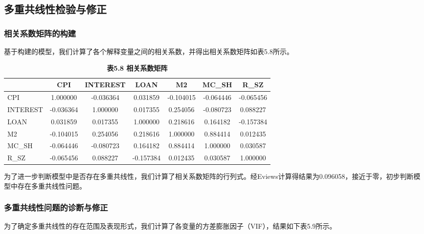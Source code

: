 \documentclass[12pt, a4paper]{article}
\numberwithin{equation}{section}
\begin{document}
\subsection{多重共线性检验与修正}
\subsubsection{相关系数矩阵的构建}
基于构建的模型，我们计算了各个解释变量之间的相关系数，并得出相关系数矩阵如表5.8所示。

\begin{table}[h!]
    \centering
    \captionsetup{labelformat=empty}
    \caption{\textbf{\fontsize{9pt}{11pt}\selectfont 表5.8 相关系数矩阵}}
    \begin{tabular}{lcccccc}
        \toprule
                 & CPI       & INTEREST  & LOAN      & M2        & MC\_SH    & R\_SZ     \\
        \midrule
        CPI      & 1.000000  & -0.036364 & 0.031859  & -0.104015 & -0.064446 & -0.065456 \\
        INTEREST & -0.036364 & 1.000000  & 0.017355  & 0.254056  & -0.080723 & 0.088227  \\
        LOAN     & 0.031859  & 0.017355  & 1.000000  & 0.218616  & 0.164182  & -0.157384 \\
        M2       & -0.104015 & 0.254056  & 0.218616  & 1.000000  & 0.884414  & 0.012435  \\
        MC\_SH   & -0.064446 & -0.080723 & 0.164182  & 0.884414  & 1.000000  & 0.030587  \\
        R\_SZ    & -0.065456 & 0.088227  & -0.157384 & 0.012435  & 0.030587  & 1.000000  \\
        \bottomrule
    \end{tabular}
\end{table}

为了进一步判断模型中是否存在多重共线性，我们计算了相关系数矩阵的行列式。经Eviews计算得结果为0.096058，接近于零，初步判断模型中存在多重共线性问题。

\subsubsection{多重共线性问题的诊断与修正}
为了确定多重共线性的存在范围及表现形式，我们计算了各变量的方差膨胀因子（VIF），结果如下表5.9所示。
\end{document}
